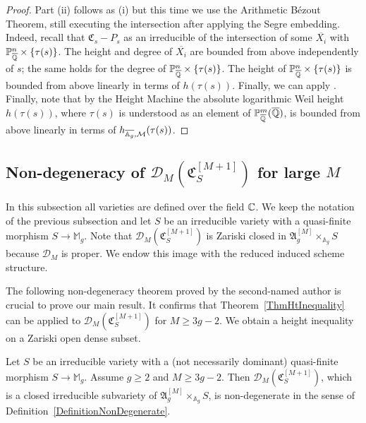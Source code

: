 \begin{proof}
  Part (ii) follows as (i) but this time we use
  the Arithmetic B\'ezout Theorem, still executing the intersection after
  applying the Segre embedding. Indeed, recall that
  $\mathfrak{C}_s-P_s$ as an irreducible
  of the intersection of some $\overline{X_i}$ with
  ${\mathbb{P}}_{\overline{\mathbb{Q}}}^n\times\{\tau(s)\}$. 
  The height and degree of $\overline{X_i}$ are
  bounded from above independently of $s$; the same holds for the
  degree of ${\mathbb{P}}_{\overline{\mathbb{Q}}}^n \times\{\tau(s)\}$. The height of
  ${\mathbb{P}}_{\overline{\mathbb{Q}}}^n \times\{\tau(s)\}$ is bounded from above linearly in terms of
  $h(\tau(s))$. Finally, we can apply \cite[Th\'eor\`eme
  3]{HauteursAlt3}.
  Finally, note that  by the Height
  Machine the absolute logarithmic Weil height $h( \tau(s))$,
  where $\tau(s)$ is understood as an element of
  ${\mathbb{P}}^m_{{\overline{\mathbb{Q}}}}({\overline{\mathbb{Q}}})$, is bounded from
  above linearly in terms of $h_{\overline{\mathbb{A}_g},{\mathcal M}}(\tau(s))$. 
\end{proof}

\subsection{Non-degeneracy of $\mathscr{D}_M(\mathfrak{C}_S^{[M+1]})$
  for large $M$}  
  In this subsection all varieties  are defined over the field ${\mathbb{C}}$. 
We keep the notation of the previous subsection and let
$S$ be an irreducible variety with a quasi-finite %
   morphism
$S\rightarrow\mathbb{M}_g$. %
Note that
$\mathscr{D}_M(\mathfrak{C}_S^{[M+1]})$ is Zariski closed
in $\mathfrak{A}_g^{[M]}\times_{\mathbb{A}_g} S$ 
because $\mathscr{D}_M$ is proper. We endow this image with the
reduced induced scheme structure.

The following non-degeneracy theorem proved by the second-named author
is crucial to prove our main result.
It confirms that
Theorem~\ref{ThmHtInequality} can be applied to
$\mathscr{D}_M(\mathfrak{C}_S^{[M+1]})$ for $M \ge 3g-2$.
We obtain a height inequality on a Zariski open dense subset. 

\begin{theorem}\label{ThmNonDegForBd}
Let $S$ be an irreducible variety with a (not necessarily dominant) quasi-finite morphism $S \rightarrow \mathbb{M}_g$. Assume $g \ge 2$ and $M
\ge 3g-2$. Then $\mathscr{D}_M( \mathfrak{C}_S^{[M+1]} )$, which is a closed 
irreducible subvariety of $\mathfrak{A}_g^{[M]}\times_{\mathbb{A}_g} S$, is 
non-degenerate in the sense of
Definition~\ref{DefinitionNonDegenerate}.
\end{theorem}

